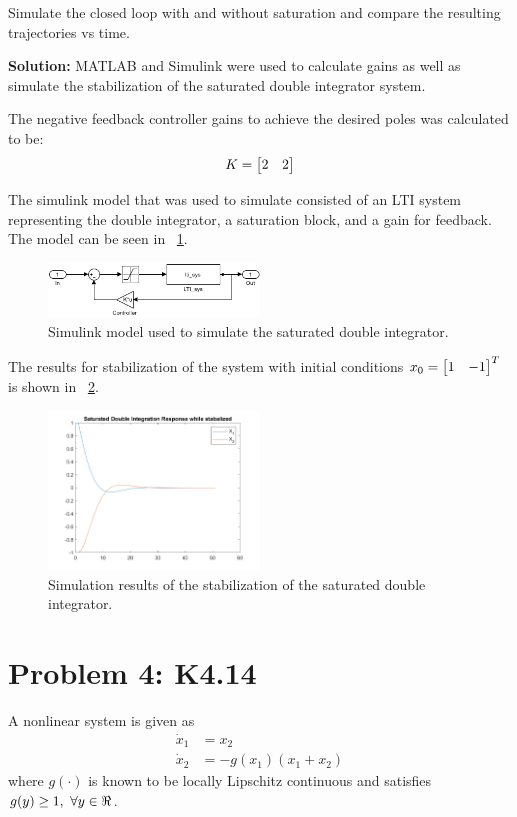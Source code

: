 \documentclass[letter]{article}
\begin{document}
Simulate the closed loop with and without saturation and compare the resulting trajectories vs time.

\noindent
\textbf{Solution:}
MATLAB and Simulink were used to calculate gains as well as simulate the stabilization of the saturated double integrator system.

The negative feedback controller gains to achieve the desired poles was calculated to be:
\begin{equation}
	K = \mqty[2 & 2]
\end{equation}

The simulink model that was used to simulate consisted of an LTI system representing the double integrator, a saturation block, and a gain for feedback. The model can be seen in \figurename \ \ref{fig:pblm3_c_model}. 
\begin{figure}[h]
	\centering
	\label{fig:pblm3_c_model}
	\includegraphics[width=0.5\textwidth]{fig/pblm3_c_model}
	\caption{Simulink model used to simulate the saturated double integrator.}
\end{figure}
The results for stabilization of the system with initial conditions $x_0 = \mqty[1 &-1]^T$ is shown in \figurename \ \ref{fig:pblm3_c_plot}.
\begin{figure}[h]
	\centering
	\label{fig:pblm3_c_plot}
	\includegraphics[width=0.5\textwidth]{fig/pblm3_c_plot}
	\caption{Simulation results of the stabilization of the saturated double integrator.}
\end{figure}









\newpage
\section{Problem 4: K4.14}
A nonlinear system is given as
\begin{equation}
	\begin{aligned}
		\dot{x}_1 &= x_2\\
		\dot{x}_2 &= -g(x_1) (x_1 + x_2)
	\end{aligned}
\end{equation}
where $g(\cdot)$ is known to be locally Lipschitz continuous and satisfies $g(y) \geq 1, \ \forall y \in \real$.
\end{document}
